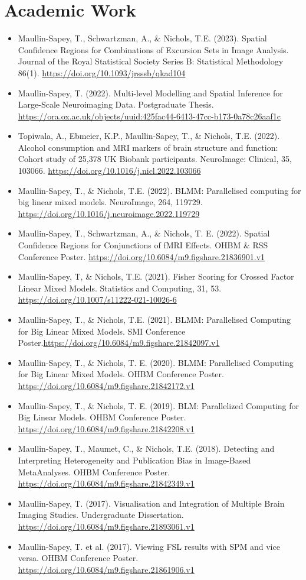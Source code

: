 \documentclass{friggeri-cv}
\begin{document}
\section{Academic Work}
\footnotesize{
\begin{itemize}
    \item Maullin-Sapey, T., Schwartzman, A., \& Nichols, T.E. (2023). Spatial Confidence Regions for Combinations of Excursion Sets in Image Analysis. Journal of the Royal Statistical Society Series B: Statistical Methodology 86(1). \url{https://doi.org/10.1093/jrsssb/qkad104}
    \item Maullin-Sapey, T. (2022). Multi-level Modelling and Spatial Inference for Large-Scale Neuroimaging Data. Postgraduate Thesis. \url{https://ora.ox.ac.uk/objects/uuid:425fac44-6413-47cc-b173-0a78c26aaf1c}
    \item Topiwala, A., Ebmeier, K.P., Maullin-Sapey, T., \& Nichols, T.E. (2022). Alcohol consumption and MRI markers of brain structure and function: Cohort study of 25,378 UK Biobank participants. NeuroImage: Clinical, 35, 103066. \url{https://doi.org/10.1016/j.nicl.2022.103066}
    \item Maullin-Sapey, T., \& Nichols, T.E. (2022). BLMM: Parallelised computing for big linear mixed models. NeuroImage, 264, 119729. \url{https://doi.org/10.1016/j.neuroimage.2022.119729}
    \item Maullin-Sapey, T., Schwartzman, A., \& Nichols, T. E. (2022). Spatial Confidence Regions for Conjunctions of fMRI Effects. OHBM \& RSS Conference Poster. \url{https://doi.org/10.6084/m9.figshare.21836901.v1}
    \item Maullin-Sapey, T, \& Nichols, T.E. (2021). Fisher Scoring for Crossed Factor Linear Mixed Models. Statistics and Computing, 31, 53. \url{https://doi.org/10.1007/s11222-021-10026-6}
    \item Maullin-Sapey, T., \& Nichols, T.E. (2021). BLMM: Parallelised Computing for Big Linear Mixed Models. SMI Conference Poster.\url{https://doi.org/10.6084/m9.figshare.21842097.v1}
    \item Maullin-Sapey, T., \& Nichols, T. E. (2020). BLMM: Parallelised Computing for Big Linear Mixed Models. OHBM Conference Poster. \url{https://doi.org/10.6084/m9.figshare.21842172.v1}
    \item Maullin-Sapey, T., \& Nichols, T. E. (2019). BLM: Parallelized Computing for Big Linear Models. OHBM Conference Poster. \url{https://doi.org/10.6084/m9.figshare.21842208.v1}
    \item Maullin-Sapey, T., Maumet, C., \& Nichols, T.E. (2018). Detecting and Interpreting Heterogeneity and Publication Bias in Image-Based MetaAnalyses. OHBM Conference Poster. \url{https://doi.org/10.6084/m9.figshare.21842349.v1}
    \item Maullin-Sapey, T. (2017). Visualisation and Integration of Multiple Brain Imaging Studies. Undergraduate Dissertation. \url{https://doi.org/10.6084/m9.figshare.21893061.v1}
    \item Maullin-Sapey, T. et al. (2017). Viewing FSL results with SPM and vice versa. OHBM Conference Poster. \url{https://doi.org/10.6084/m9.figshare.21861906.v1}
\end{itemize}
}
\end{document}
